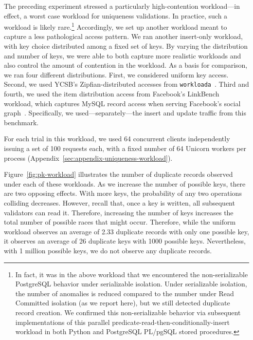  The preceding experiment stressed a
particularly high-contention workload---in effect, a worst case
workload for uniqueness validations. In practice, such a workload is
likely rare.\footnote{In fact, it was in the above workload that we
  encountered the non-serializable PostgreSQL behavior under
  serializable isolation. Under serializable isolation, the number of
  anomalies is reduced compared to the number under Read Committed
  isolation (as we report here), but we still detected duplicate
  record creation. We confirmed this non-serializable behavior via
  subsequent implementations of this parallel
  predicate-read-then-conditionally-insert workload in both Python and
  PostgreSQL PL/pgSQL stored procedures.} Accordingly, we set up
another workload meant to capture a less pathological access
pattern. We ran another insert-only workload, with key choice
distributed among a fixed set of keys. By varying the distribution and
number of keys, we were able to both capture more realistic workloads
and also control the amount of contention in the workload. As a basis
for comparison, we ran four different distributions. First, we
considered uniform key access. Second, we used YCSB's
Zipfian-distributed accesses from
\texttt{workloada}~\cite{ycsb}. Third and fourth, we used the item
distribution access from Facebook's LinkBench workload, which captures
MySQL record access when serving Facebook's social
graph~\cite{linkbench}. Specifically, we used---separately---the
insert and update traffic from this benchmark.

For each trial in this workload, we used 64 concurrent clients
independently issuing a set of 100 requests each, with a fixed number
of 64 Unicorn workers per process (Appendix~\ref{sec:appendix-uniqueness-workload}). 

Figure~\ref{fig:pk-workload} illustrates the number of duplicate
records observed under each of these workloads. As we increase the
number of possible keys, there are two opposing effects. With
more keys, the probability of any two operations colliding
decreases. However, recall that, once a key is written, all subsequent
validators can read it. Therefore, increasing the number of keys
increases the total number of possible races that might
occur. Therefore, while the uniform workload observes an average of
2.33 duplicate records with only one possible key, it observes an average of 26
duplicate keys with 1000 possible keys. Nevertheless, with 1 million possible
keys, we do not observe any duplicate records.

